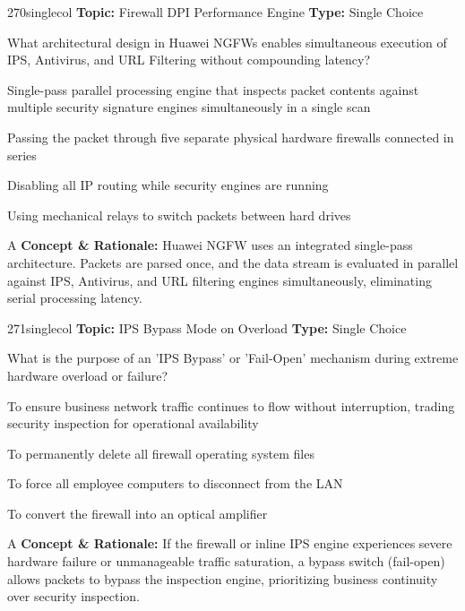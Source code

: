 \begin{qcard}{270}{singlecol}
\textcolor{darkslate!75}{\small\textbf{Topic:} Firewall DPI Performance Engine \hfill \textbf{Type:} Single Choice}\vspace{0.4em}\par
What architectural design in Huawei NGFWs enables simultaneous execution of IPS, Antivirus, and URL Filtering without compounding latency?
\begin{qoptions}
\item Single-pass parallel processing engine that inspects packet contents against multiple security signature engines simultaneously in a single scan
\item Passing the packet through five separate physical hardware firewalls connected in series
\item Disabling all IP routing while security engines are running
\item Using mechanical relays to switch packets between hard drives
\end{qoptions}
\end{qcard}
\nopagebreak
\begin{explainbox}{A}
\textbf{Concept \& Rationale:} Huawei NGFW uses an integrated single-pass architecture. Packets are parsed once, and the data stream is evaluated in parallel against IPS, Antivirus, and URL filtering engines simultaneously, eliminating serial processing latency.
\end{explainbox}

\begin{qcard}{271}{singlecol}
\textcolor{darkslate!75}{\small\textbf{Topic:} IPS Bypass Mode on Overload \hfill \textbf{Type:} Single Choice}\vspace{0.4em}\par
What is the purpose of an 'IPS Bypass' or 'Fail-Open' mechanism during extreme hardware overload or failure?
\begin{qoptions}
\item To ensure business network traffic continues to flow without interruption, trading security inspection for operational availability
\item To permanently delete all firewall operating system files
\item To force all employee computers to disconnect from the LAN
\item To convert the firewall into an optical amplifier
\end{qoptions}
\end{qcard}
\nopagebreak
\begin{explainbox}{A}
\textbf{Concept \& Rationale:} If the firewall or inline IPS engine experiences severe hardware failure or unmanageable traffic saturation, a bypass switch (fail-open) allows packets to bypass the inspection engine, prioritizing business continuity over security inspection.
\end{explainbox}

